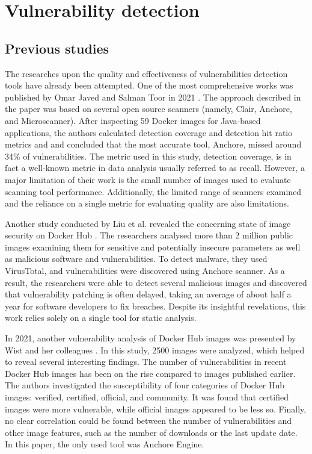 \section{Vulnerability detection}
\subsection{Previous studies}

The researches upon the quality and effectiveness of vulnerabilities detection tools have already been attempted. One of the most comprehensive works was published by Omar Javed and Salman Toor in 2021 \cite{arxiv:1}. The approach described in the paper was based on several open source scanners (namely, Clair, Anchore, and Microscanner). After inspecting 59 Docker images for Java-based applications, the authors calculated detection coverage and detection hit ratio metrics and and concluded that the most accurate tool, Anchore, missed around 34\% of vulnerabilities. The metric used in this study, detection coverage, is in fact a well-known metric in data analysis usually referred to as recall. However, a major limitation of their work is the small number of images used to evaluate scanning tool performance. Additionally, the limited range of scanners examined and the reliance on a single metric for evaluating quality are also limitations.

Another study conducted by Liu et al. revealed the concerning state of image security on Docker Hub \cite{c:16}. The researchers analysed more than 2 million public images examining them for sensitive and potentially insecure parameters as well as malicious software and vulnerabilities. To detect malware, they used VirusTotal, and vulnerabilities were discovered using Anchore scanner. As a result, the researchers were able to detect several malicious images and discovered that vulnerability patching is often delayed, taking an average of about half a year for software developers to fix breaches. Despite its insightful revelations, this work relies solely on a single tool for static analysis.

In 2021, another vulnerability analysis of Docker Hub images was presented by Wist and her colleagues \cite{c:17}. In this study, 2500 images were analyzed, which helped to reveal several interesting findings. The number of vulnerabilities in recent Docker Hub images has been on the rise compared to images published earlier. The authors investigated the susceptibility of four categories of Docker Hub images: verified, certified, official, and community. It was found that certified images were more vulnerable, while official images appeared to be less so. Finally, no clear correlation could be found between the number of vulnerabilities and other image features, such as the number of downloads or the last update date. In this paper, the only used tool was Anchore Engine.

